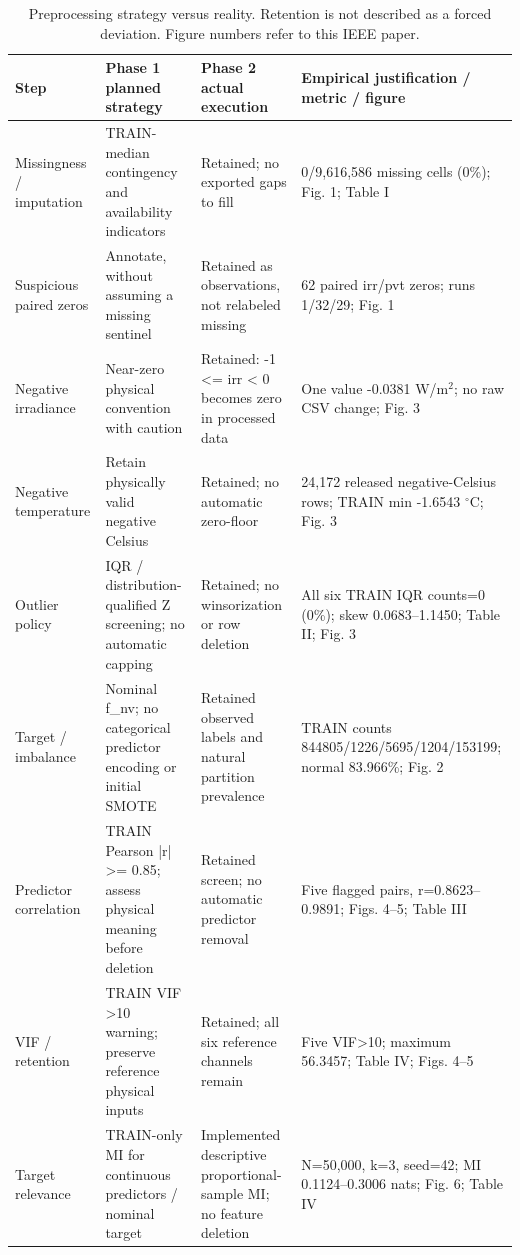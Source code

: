 \documentclass[conference]{IEEEtran}
\begin{document}
\begin{table}[!t]
\caption{Preprocessing strategy versus reality. Retention is not described as a forced deviation. Figure numbers refer to this IEEE paper.}\label{tab:strategy1}
\centering\footnotesize
\begin{tabularx}{\textwidth}{YYYY}
\toprule
Step & Phase 1 planned strategy & Phase 2 actual execution & Empirical justification / metric / figure \\ \midrule
Missingness / imputation & TRAIN-median contingency and availability indicators & Retained; no exported gaps to fill & 0/9,616,586 missing cells (0\%); Fig. 1; Table I \\
Suspicious paired zeros & Annotate, without assuming a missing sentinel & Retained as observations, not relabeled missing & 62 paired irr/pvt zeros; runs 1/32/29; Fig. 1 \\
Negative irradiance & Near-zero physical convention with caution & Retained: -1 <= irr < 0 becomes zero in processed data & One value -0.0381 W/m$^2$; no raw CSV change; Fig. 3 \\
Negative temperature & Retain physically valid negative Celsius & Retained; no automatic zero-floor & 24,172 released negative-Celsius rows; TRAIN min -1.6543 $^\circ$C; Fig. 3 \\
Outlier policy & IQR / distribution-qualified Z screening; no automatic capping & Retained; no winsorization or row deletion & All six TRAIN IQR counts=0 (0\%); skew 0.0683--1.1450; Table II; Fig. 3 \\
Target / imbalance & Nominal f\_nv; no categorical predictor encoding or initial SMOTE & Retained observed labels and natural partition prevalence & TRAIN counts 844805/1226/5695/1204/153199; normal 83.966\%; Fig. 2 \\
Predictor correlation & TRAIN Pearson |r| >= 0.85; assess physical meaning before deletion & Retained screen; no automatic predictor removal & Five flagged pairs, r=0.8623--0.9891; Figs. 4--5; Table III \\
VIF / retention & TRAIN VIF >10 warning; preserve reference physical inputs & Retained; all six reference channels remain & Five VIF>10; maximum 56.3457; Table IV; Figs. 4--5 \\
Target relevance & TRAIN-only MI for continuous predictors / nominal target & Implemented descriptive proportional-sample MI; no feature deletion & N=50,000, k=3, seed=42; MI 0.1124--0.3006 nats; Fig. 6; Table IV \\
\bottomrule
\end{tabularx}
\end{table}
\end{document}
